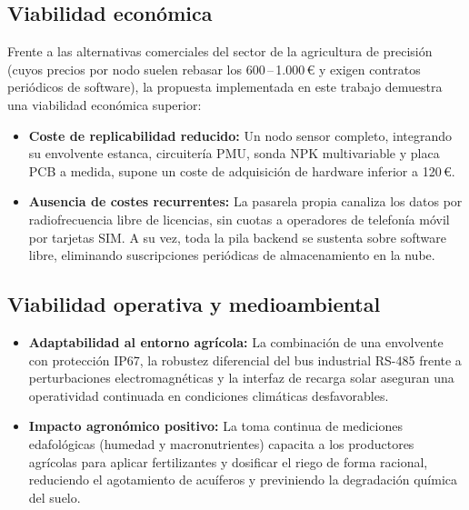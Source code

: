 \subsection{Viabilidad económica}
Frente a las alternativas comerciales del sector de la agricultura de precisión (cuyos precios por nodo suelen rebasar los 600\,--\,1.000\,€ y exigen contratos periódicos de software), la propuesta implementada en este trabajo demuestra una viabilidad económica superior:
\begin{itemize}
    \item \textbf{Coste de replicabilidad reducido:} Un nodo sensor completo, integrando su envolvente estanca, circuitería PMU, sonda NPK multivariable y placa PCB a medida, supone un coste de adquisición de hardware inferior a 120\,€.
    \item \textbf{Ausencia de costes recurrentes:} La pasarela propia canaliza los datos por radiofrecuencia libre de licencias, sin cuotas a operadores de telefonía móvil por tarjetas SIM. A su vez, toda la pila backend se sustenta sobre software libre, eliminando suscripciones periódicas de almacenamiento en la nube.
\end{itemize}

\subsection{Viabilidad operativa y medioambiental}
\begin{itemize}
    \item \textbf{Adaptabilidad al entorno agrícola:} La combinación de una envolvente con protección IP67, la robustez diferencial del bus industrial RS-485 frente a perturbaciones electromagnéticas y la interfaz de recarga solar aseguran una operatividad continuada en condiciones climáticas desfavorables.
    \item \textbf{Impacto agronómico positivo:} La toma continua de mediciones edafológicas (humedad y macronutrientes) capacita a los productores agrícolas para aplicar fertilizantes y dosificar el riego de forma racional, reduciendo el agotamiento de acuíferos y previniendo la degradación química del suelo.
\end{itemize}
